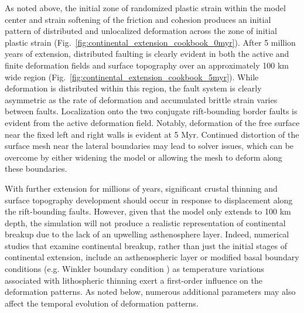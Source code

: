 As noted above, the initial zone of randomized plastic strain within the model center and strain softening of the friction and cohesion produces an initial pattern of distributed and unlocalized deformation across the zone of initial plastic strain (Fig.~\ref{fig:continental_extension_cookbook_0myr}). After 5 million years of extension, distributed faulting is clearly evident in both the active and finite deformation fields and surface topography over an approximately 100 km wide region (Fig.~\ref{fig:continental_extension_cookbook_5myr}). While deformation is distributed within this region, the fault system is clearly asymmetric as the rate of deformation and accumulated brittle strain varies between faults. Localization onto the two conjugate rift-bounding border faults is evident from the active deformation field. Notably, deformation of the free surface near the fixed left and right walls is evident at 5 Myr. Continued distortion of the surface mesh near the lateral boundaries may lead to solver issues, which can be overcome by either widening the model or allowing the mesh to deform along these boundaries.  

With further extension for millions of years, significant crustal thinning and surface topography development should occur in response to displacement along the rift-bounding faults. However, given that the model only extends to 100 km depth, the simulation will not produce a realistic representation of continental breakup due to the lack of an upwelling asthenosphere layer. Indeed, numerical studies that examine continental breakup, rather than just the initial stages of continental extension, include an asthenospheric layer or modified basal boundary conditions (e.g. Winkler boundary condition \cite[for example]{Bru14}) as temperature variations associated with lithospheric thinning exert a first-order influence on the deformation patterns. As noted below, numerous additional parameters may also affect the temporal evolution of deformation patterns.


